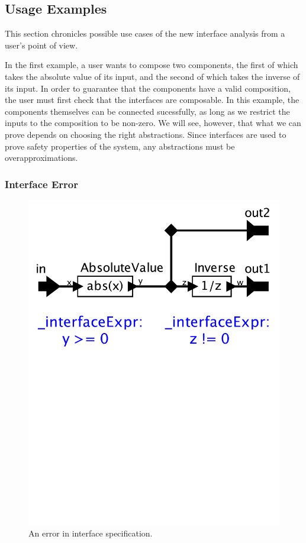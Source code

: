 \documentclass[preprint,11pt]{sigplanconf}
\begin{document}
\subsection{Usage Examples}
This section chronicles possible use cases of the new interface analysis from a
user's point of view.

In the first example, a user wants to compose two components, the first of
which takes the absolute value of its input, and the second of which takes the
inverse of its input. In order to guarantee that the components have a valid
composition, the user must first check that the interfaces are composable.
In this example, the components themselves can be connected sucessfully, as
long as we restrict the inputs to the composition to be non-zero.  We will see,
however, that what we can prove depends on choosing the right abstractions.
Since interfaces are used to prove safety properties of the system, any
abstractions must be overapproximations.

\subsubsection{Interface Error}
\begin{figure}[htbp]
\centering
\includegraphics[width=\columnwidth]{figs/absoluteError}
\caption{An error in interface specification.}
\label{fig:absoluteError}
\end{figure}
\end{document}

